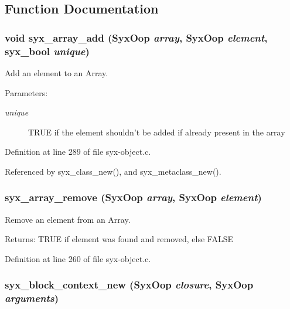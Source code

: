 \subsection{Function Documentation}
\hypertarget{syx-object_8c_45d10f545165a46c4c22fa8a59927e6b}{
\subsubsection{\setlength{\rightskip}{0pt plus 5cm}void syx\_\-array\_\-add ({\bf SyxOop} {\em array}, \/  {\bf SyxOop} {\em element}, \/  {\bf syx\_\-bool} {\em unique})}}
\label{syx-object_8c_45d10f545165a46c4c22fa8a59927e6b}


Add an element to an Array.

\begin{Desc}
\item[Parameters:]
\begin{description}
\item[{\em unique}]TRUE if the element shouldn't be added if already present in the array \end{description}
\end{Desc}


Definition at line 289 of file syx-object.c.

Referenced by syx\_\-class\_\-new(), and syx\_\-metaclass\_\-new().\hypertarget{syx-object_8c_2e1d56f1b3a60304028b5b3267eea2ac}{
\subsubsection{ syx\_\-array\_\-remove ({\bf SyxOop} {\em array}, \/  {\bf SyxOop} {\em element})}}
\label{syx-object_8c_2e1d56f1b3a60304028b5b3267eea2ac}


Remove an element from an Array.

\begin{Desc}
\item[Returns:]TRUE if element was found and removed, else FALSE \end{Desc}


Definition at line 260 of file syx-object.c.\hypertarget{syx-object_8c_5b0e62ae669fb1a068cba533885c48d3}{
\subsubsection{ syx\_\-block\_\-context\_\-new ({\bf SyxOop} {\em closure}, \/  {\bf SyxOop} {\em arguments})}}
\label{syx-object_8c_5b0e62ae669fb1a068cba533885c48d3}


